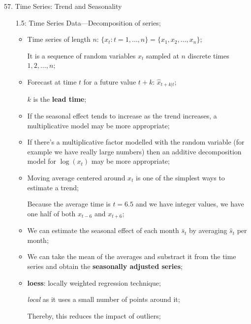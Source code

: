 \documentclass[12pt, titlepage, french]{report}
\begin{document}
\begin{CHPT_SUMM_AUTO}[label = {L.-57}]{57. Time Series: Trend and Seasonality}
\begin{itemize}
\begin{itemize}
		\texttt{[image: src/TS-TREND-SPLIT-PLOTS.png]}
		\item	This also highlights the importance of not extrapolating---without additional information we don't know whether the trend will continue;
		\item	Idea that 2 unrelated time series will be correlated if they both contain a trend thus we can't attribute global warming to fossil fuel increase without a physical explanation;
		\item	As per scientists, we judge appropriate to attribute a \textbf{causal relationship} and to expect mean global temperature to continue rising if greenhouse gas emissions aren't reduced;
		\end{itemize}
	\item[1.5:]	Time Series Data---Decomposition of series;
		\begin{itemize}
	\item	Time series of length $n$: $\{x_{t} : t = 1, \dots, n\} = \{x_{1}, x_{2}, \dots, x_{n}\}$;
	\item[]	It is a sequence of random variables $x_{t}$ sampled at $n$ discrete times $1, 2, \dots, n$;
	\item	Forecast at time $t$ for a future value $t + k$: $\hat{x}_{t + k | t}$;
	\item[]	$k$ is the \textbf{lead time};
		\end{itemize}
		\begin{itemize}
		\item	If the seasonal effect tends to increase as the trend increases, a multiplicative model may be more appropriate;
		\item	If there's a multiplicative factor modelled with the random variable (for example we have really large numbers) then an additive decomposition model for $\log(x_{t})$ may be more appropriate;
		\end{itemize}
		\begin{itemize}
		\item	Moving average centered around $x_{t}$ is one of the simplest ways to estimate a trend;
		\item[]	Because the average time is $t = 6.5$ and we have integer values, we have one half of both $x_{t - 6}$ and $x_{t + 6}$;
		\item	We can estimate the seasonal effect of each month $\bar{s}_{t}$ by averaging $\hat{s}_{t}$ per month;
		\item	We can take the mean of the averages and substract it from the time series and obtain the \textbf{seasonally adjusted series};
		\end{itemize}
		\begin{itemize}
		\item	\textbf{loess}: locally weighted regression technique;
		\item[]	\og \textit{local} \fg{} as it uses a \og small \fg{}  number of points \og around \fg{}  it;
		\item[]	Thereby, this reduces the impact of outliers;
		\end{itemize}
\end{itemize}


\end{CHPT_SUMM_AUTO}
\end{document}
